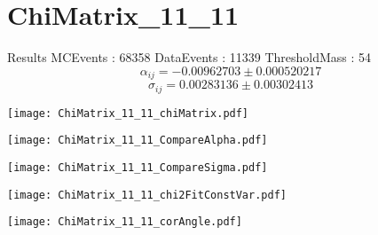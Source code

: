 \documentclass[a4paper,12pt]{article}
\begin{document}
\section{ChiMatrix\_11\_11}
\begin{minipage}{0.49\linewidth} Results \newline
MCEvents : 68358\newline
DataEvents : 11339 \newline
ThresholdMass : 54\\
$$\alpha_{ij} = -0.00962703\pm 0.000520217$$
$$\sigma_{ij} = 0.00283136\pm 0.00302413$$
\end{minipage}\hfill
\begin{minipage}{0.49\linewidth} 
\texttt{[image: ChiMatrix\_11\_11\_chiMatrix.pdf]}\\
\end{minipage}
\hfill
\begin{minipage}{0.49\linewidth} 
\texttt{[image: ChiMatrix\_11\_11\_CompareAlpha.pdf]}\\
\end{minipage}
\hfill
\begin{minipage}{0.49\linewidth} 
\texttt{[image: ChiMatrix\_11\_11\_CompareSigma.pdf]}\\
\end{minipage}
\begin{minipage}{0.49\linewidth} 
\texttt{[image: ChiMatrix\_11\_11\_chi2FitConstVar.pdf]}\\
\end{minipage}
\hfill
\begin{minipage}{0.49\linewidth} 
\texttt{[image: ChiMatrix\_11\_11\_corAngle.pdf]}\\
\end{minipage}
\end{document}

